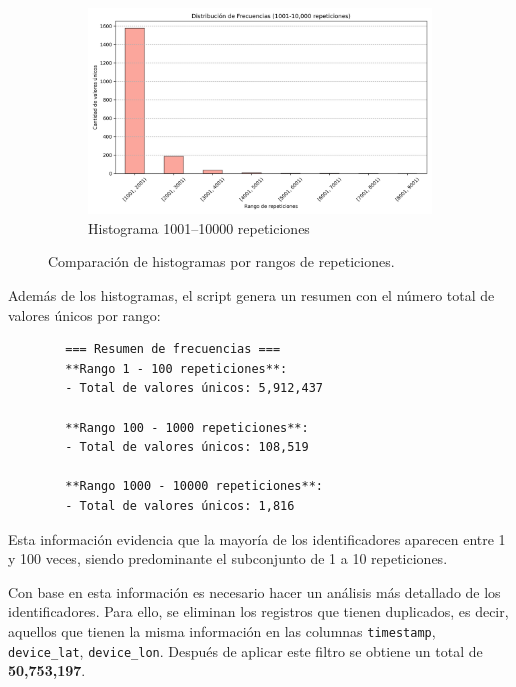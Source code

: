 \begin{figure}[htbp]
    \begin{subfigure}[t]{0.48\textwidth}
        \centering
        \includegraphics[width=\linewidth]{img/histograma_1001_10000.png}
        \caption{Histograma 1001–10000 repeticiones}
        \label{fig:sub3}
    \end{subfigure}

    \caption{Comparación de histogramas por rangos de repeticiones.}
    \label{fig:histogramas}
\end{figure}

Además de los histogramas, el script genera un resumen con el número total de valores únicos por rango:

\begin{verbatim}
        === Resumen de frecuencias ===
        **Rango 1 - 100 repeticiones**:
        - Total de valores únicos: 5,912,437

        **Rango 100 - 1000 repeticiones**:
        - Total de valores únicos: 108,519

        **Rango 1000 - 10000 repeticiones**:
        - Total de valores únicos: 1,816
\end{verbatim}

Esta información evidencia que la mayoría de los identificadores aparecen entre 1 y 100 veces, siendo predominante el subconjunto de 1 a 10 repeticiones. 

\newpage
Con base en esta información es necesario hacer un análisis más detallado de los identificadores. Para ello, se eliminan los registros que tienen duplicados, es decir, aquellos que tienen la misma información en las columnas \texttt{timestamp}, \texttt{device\_lat}, \texttt{device\_lon}. Después de aplicar este filtro se obtiene un total de \textbf{50,753,197}. 


